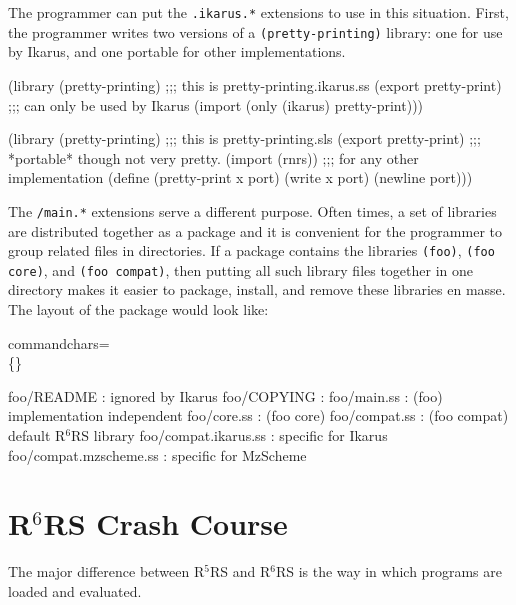 \documentclass[onecolumn, 12pt, twoside, openright, dvipdfm]{book}
\newcommand{\rnrs}[1]{R$^{\mathrm{#1}}$RS}
\begin{document}
The programmer can put the \verb|.ikarus.*| extensions to use in
this situation.  First, the programmer writes two versions of a
\verb|(pretty-printing)| library: one for use by Ikarus, and one
portable for other implementations.

\begin{CodeInline}
(library (pretty-printing) ;;; this is pretty-printing.ikarus.ss
  (export pretty-print)    ;;; can only be used by Ikarus
  (import (only (ikarus) pretty-print)))
\end{CodeInline}

\begin{CodeInline}
(library (pretty-printing) ;;; this is pretty-printing.sls
  (export pretty-print)    ;;; *portable* though not very pretty.
  (import (rnrs))          ;;; for any other implementation
  (define (pretty-print x port)
    (write x port)
    (newline port)))
\end{CodeInline}

The \verb|/main.*| extensions serve a different purpose.  Often
times, a set of libraries are distributed together as a package and
it is convenient for the programmer to group related files in
directories.  If a package contains the libraries \verb|(foo)|,
\verb|(foo core)|, and \verb|(foo compat)|, then putting all such
library files together in one directory makes it easier to
package, install, and remove these libraries en masse.  The layout
of the package would look like:

 {%
  commandchars=\\\{\}}

\begin{Code}
  foo/README              :              {\textrm{ignored by Ikarus}}
  foo/COPYING             :
  foo/main.ss             : (foo)        {\textrm{implementation independent}}
  foo/core.ss             : (foo core) 
  foo/compat.ss           : (foo compat) {\textrm{default \rnrs{6} library}}
  foo/compat.ikarus.ss    :              {\textrm{specific for Ikarus}}
  foo/compat.mzscheme.ss  :              {\textrm{specific for MzScheme}}
\end{Code}

\chapter{\rnrs{6} Crash Course}

The major difference between \rnrs{5} and \rnrs{6} is the way
in which programs are loaded and evaluated.  
\end{document}
